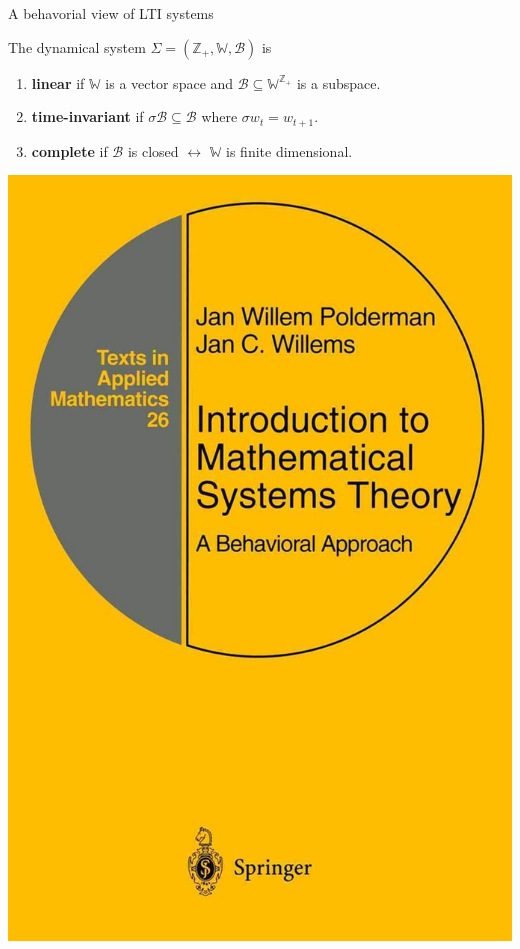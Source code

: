 \documentclass[aspectratio=169,compress,12pt,dvipsnames]{beamer}
\begin{document}
\begin{frame}[t, c]{A behavorial view of LTI systems}
    \vfill
    \begin{minipage}{.68\textwidth}
        \begin{definition}
            The dynamical system $\Sigma = \left( \mathbb{Z}_+, \mathbb{W}, \mathcal{B} \right)$ is
            \par\bigskip
            \begin{enumerate}
                \item   \textbf{linear} if $\mathbb{W}$ is a vector space and $\mathcal{B} \subseteq \mathbb{W}^{\mathbb{Z}_+}$ is a subspace.
                \item   \textbf{time-invariant} if $\sigma \mathcal{B} \subseteq \mathcal{B}$ where $\sigma w_t = w_{t+1}$.
                \item   \textbf{complete} if $\mathcal{B}$ is closed $\leftrightarrow$ $\mathbb{W}$ is finite dimensional.
            \end{enumerate}
        \end{definition}
    \end{minipage}%
    \hfill
    \begin{minipage}{.28\textwidth}
        \centering
        \includegraphics[width=\textwidth]{willems_book.jpg}
    \end{minipage}
    \vfill
\end{frame}
\end{document}
